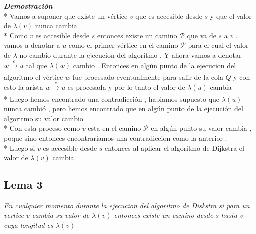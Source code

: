 \documentclass[10pt]{article}
\begin{document}
        \vspace{0.5cm}
        \noindent \textit{\textbf{Demostraci\'on}}
        \\*
        Vamos a suponer que existe un v\'ertice $v$ que es accesible desde $s$
        y que el valor de $\lambda\left(v\right)$ nunca cambia 
        \\*
        Como $v$ es accesible desde $s$ entonces existe un camino $\mathcal{P} $
        que va de $s$ a $v$ . vamos a denotar a $u$ como el primer v\'ertice en 
        el camino $\mathcal{P}$ para el cual el valor de $\lambda$ no cambio
        durante la ejecucion del algoritmo . Y ahora vamos a denotar $w \xrightarrow[]{e} u$ 
        tal que  $\lambda\left(w\right)$ cambio . Entonces en alg\'un punto de la 
        ejecucion del algoritmo el v\'ertice $w$ fue procesado eventualmente para
        salir de la cola $Q$ y con esto la arista $w \xrightarrow[]{e} u$  es procesada y por
        lo tanto el valor de $\lambda\left(u\right)$ cambia 
        \\*
        Luego hemos encontrado una contradicci\'on , habiamos supuesto que 
        $\lambda\left(u\right)$ nunca cambi\'o , pero hemos encontrado que en alg\'un 
        punto de la ejecuci\'on del algoritmo su valor cambio 
        \\*
        Con esta proceso como $v$ esta en el camino $\mathcal{P}$ en alg\'un punto 
        su valor cambia , poque sino entonces encontrariamos una contradiccion como 
        la anterior . 
        \\*
        Luego si $v$ es accesible desde $s$ entonces al aplicar el algoritmo de Dijkstra
        el valor de $\lambda\left(v\right)$ cambia.
        
    \subsection*{Lema 3}

        \noindent \textit{En cualquier momento durante la ejecucion del algoritmo de Diskstra si 
        para un vertice $v $ cambia  su valor de $\lambda\left(v\right)$ entonces existe 
        un camino desde $s$ hasta $v$ cuya longitud es $\lambda\left(v\right)$}
\end{document}
